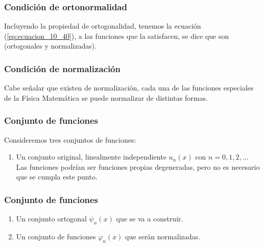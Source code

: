 \documentclass[12pt]{beamer}
\begin{document}
\begin{frame}
\frametitle{Condición de ortonormalidad}
Incluyendo la propiedad de ortogonalidad, tenemos la ecuación (\ref{eq:ecuacion_10_40}), a las funciones que la satisfacen, se dice que son  (ortogonales y normalizadas).
\end{frame}
\begin{frame}
\frametitle{Condición de normalización}
Cabe señalar que existen  de normalización, \pause cada una de las funciones especiales de la Física Matemática se puede normalizar de distintas formas.
\end{frame}
\begin{frame}
\frametitle{Conjunto de funciones}
Consideremos tres conjuntos de funciones:
\pause
{}
\begin{enumerate}
\item Un conjunto original, linealmente independiente $u_{n}(x)$ con $n=0,1,2,\ldots$ \\
Las funciones podrían ser funciones propias degeneradas, pero no es necesario que se cumpla este punto.
\seti
\end{enumerate}
\end{frame}
\begin{frame}
\frametitle{Conjunto de funciones}
\begin{enumerate}[<+->]  
\conti
\item Un conjunto ortogonal $\psi_{n}(x)$ que se va a construir.
\item Un conjunto de funciones $\varphi_{n}(x)$ que serán normalizadas. 
\end{enumerate}
\end{frame}
\end{document}
